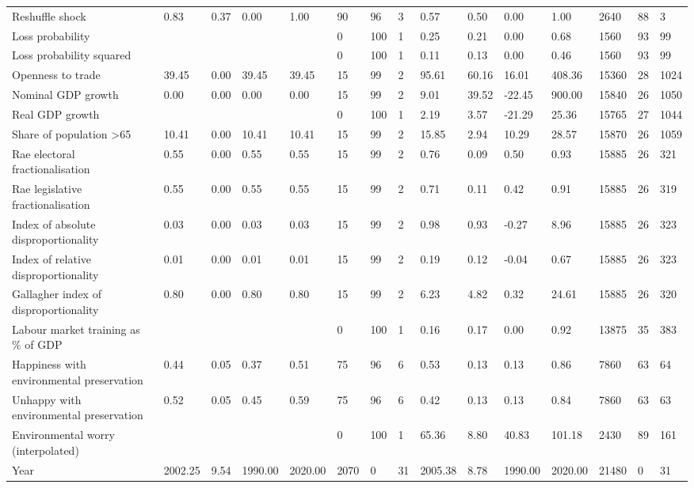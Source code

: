 \begin{longtable}{lllllllllllllll}
\addlinespace
Reshuffle shock & 0.83 & 0.37 & 0.00 & 1.00 & 90 & 96 & 3 & 0.57 & 0.50 & 0.00 & 1.00 & 2640 & 88 & 3\\
Loss probability &  &  &  &  & 0 & 100 & 1 & 0.25 & 0.21 & 0.00 & 0.68 & 1560 & 93 & 99\\
Loss probability squared &  &  &  &  & 0 & 100 & 1 & 0.11 & 0.13 & 0.00 & 0.46 & 1560 & 93 & 99\\
Openness to trade & 39.45 & 0.00 & 39.45 & 39.45 & 15 & 99 & 2 & 95.61 & 60.16 & 16.01 & 408.36 & 15360 & 28 & 1024\\
Nominal GDP growth & 0.00 & 0.00 & 0.00 & 0.00 & 15 & 99 & 2 & 9.01 & 39.52 & -22.45 & 900.00 & 15840 & 26 & 1050\\
\addlinespace
Real GDP growth &  &  &  &  & 0 & 100 & 1 & 2.19 & 3.57 & -21.29 & 25.36 & 15765 & 27 & 1044\\
Share of population >65 & 10.41 & 0.00 & 10.41 & 10.41 & 15 & 99 & 2 & 15.85 & 2.94 & 10.29 & 28.57 & 15870 & 26 & 1059\\
Rae electoral fractionalisation & 0.55 & 0.00 & 0.55 & 0.55 & 15 & 99 & 2 & 0.76 & 0.09 & 0.50 & 0.93 & 15885 & 26 & 321\\
Rae legislative fractionalisation & 0.55 & 0.00 & 0.55 & 0.55 & 15 & 99 & 2 & 0.71 & 0.11 & 0.42 & 0.91 & 15885 & 26 & 319\\
Index of absolute disproportionality & 0.03 & 0.00 & 0.03 & 0.03 & 15 & 99 & 2 & 0.98 & 0.93 & -0.27 & 8.96 & 15885 & 26 & 323\\
\addlinespace
Index of relative disproportionality & 0.01 & 0.00 & 0.01 & 0.01 & 15 & 99 & 2 & 0.19 & 0.12 & -0.04 & 0.67 & 15885 & 26 & 323\\
Gallagher index of disproportionality & 0.80 & 0.00 & 0.80 & 0.80 & 15 & 99 & 2 & 6.23 & 4.82 & 0.32 & 24.61 & 15885 & 26 & 320\\
Labour market training as \% of GDP &  &  &  &  & 0 & 100 & 1 & 0.16 & 0.17 & 0.00 & 0.92 & 13875 & 35 & 383\\
Happiness with environmental preservation & 0.44 & 0.05 & 0.37 & 0.51 & 75 & 96 & 6 & 0.53 & 0.13 & 0.13 & 0.86 & 7860 & 63 & 64\\
Unhappy with environmental preservation & 0.52 & 0.05 & 0.45 & 0.59 & 75 & 96 & 6 & 0.42 & 0.13 & 0.13 & 0.84 & 7860 & 63 & 63\\
\addlinespace
Environmental worry (interpolated) &  &  &  &  & 0 & 100 & 1 & 65.36 & 8.80 & 40.83 & 101.18 & 2430 & 89 & 161\\
Year & 2002.25 & 9.54 & 1990.00 & 2020.00 & 2070 & 0 & 31 & 2005.38 & 8.78 & 1990.00 & 2020.00 & 21480 & 0 & 31\\
\bottomrule
\end{longtable}
